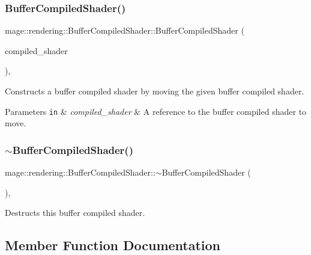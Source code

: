 \subsubsection{\texorpdfstring{Buffer\+Compiled\+Shader()}{BufferCompiledShader()}\hspace{0.1cm}{\footnotesize\ttfamily [3/3]}}
{\footnotesize\ttfamily mage\+::rendering\+::\+Buffer\+Compiled\+Shader\+::\+Buffer\+Compiled\+Shader (\begin{DoxyParamCaption}\item[{\mbox{\hyperlink{classmage_1_1rendering_1_1_buffer_compiled_shader}{Buffer\+Compiled\+Shader}} \&\&}]{compiled\+\_\+shader }\end{DoxyParamCaption})\hspace{0.3cm}{\ttfamily [default]}, {\ttfamily [noexcept]}}

Constructs a buffer compiled shader by moving the given buffer compiled shader.


\begin{DoxyParams}[1]{Parameters}
\mbox{\tt in}  & {\em compiled\+\_\+shader} & A reference to the buffer compiled shader to move. \\
\hline
\end{DoxyParams}
\mbox{\label{classmage_1_1rendering_1_1_buffer_compiled_shader_af989fa0356f17de9dd75b76aace3f106}} 
\subsubsection{\texorpdfstring{$\sim$\+Buffer\+Compiled\+Shader()}{~BufferCompiledShader()}}
{\footnotesize\ttfamily mage\+::rendering\+::\+Buffer\+Compiled\+Shader\+::$\sim$\+Buffer\+Compiled\+Shader (\begin{DoxyParamCaption}{ }\end{DoxyParamCaption})\hspace{0.3cm}{\ttfamily [virtual]}, {\ttfamily [default]}}

Destructs this buffer compiled shader. 

\subsection{Member Function Documentation}
\mbox{\label{classmage_1_1rendering_1_1_buffer_compiled_shader_aa19ad53b2761c07689476c3d77369b61}} 
